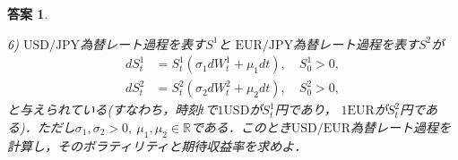 \documentclass[11pt,a4paper]{jsarticle}
\theoremstyle{mystyle}
\newtheorem*{ans}{答案}
\begin{document}
\begin{ans}
\begin{itembox}[l]{6)}
	$\mbox{USD}/\mbox{JPY}$為替レート過程を表す$S^{1}$と
	$\mbox{EUR}/\mbox{JPY}$為替レート過程を表す$S^{2}$が
	\begin{align}
		dS^{1}_{t} &= S^{1}_{t}(\sigma_{1}dW^{1}_{t} + \mu_{1}dt), \quad S^{1}_{0} > 0, \\
		dS^{2}_{t} &= S^{2}_{t}(\sigma_{2}dW^{2}_{t} + \mu_{2}dt), \quad S^{2}_{0} > 0, 
	\end{align}
	と与えられている(すなわち，時刻$t$で$1\mbox{USD}$が$S^{1}_{t}$円であり，
	$\mbox{1EUR}$が$S^{2}_{t}$円である)．ただし$\sigma_{1},\sigma_{2} > 0,\ 
	\mu_{1},\mu_{2} \in \mathbb{R}$である．このとき$\mbox{USD}/\mbox{EUR}$為替レート過程を
	計算し，そのボラティリティと期待収益率を求めよ．
\end{itembox}


\end{ans}
\end{document}
